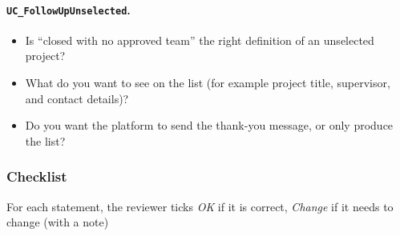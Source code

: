 \documentclass[12pt, titlepage]{article}
\begin{document}
  \paragraph{\texttt{UC\_FollowUpUnselected}.}
  \begin{itemize}
    \item Is ``closed with no approved team'' the right definition of an unselected project?
    \item What do you want to see on the list (for example project title, supervisor, and contact details)?
    \item Do you want the platform to send the thank-you message, or only produce the list?
  \end{itemize}

  \subsubsection{Checklist}

  For each statement, the reviewer ticks \emph{OK} if it is correct, \emph{Change} if it needs to change (with a note)
\end{document}
